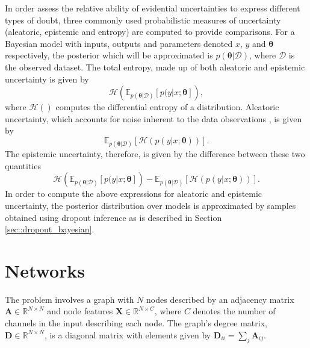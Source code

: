 \documentclass[
twocolumn,
]{ceurart}
\begin{document}
In order assess the relative ability of evidential uncertainties to express different types of doubt, three commonly used probabilistic measures of uncertainty (aleatoric, epistemic and entropy) are computed to provide comparisons.
For a Bayesian model with inputs, outputs and parameters denoted $x$, $y$ and $\boldsymbol{\theta}$ respectively, the posterior which will be approximated is $p(\boldsymbol{\theta}\vert\mathcal{D})$, where $\mathcal{D}$ is the observed dataset.
The total entropy, made up of both aleatoric and epistemic uncertainty \cite{Depeweg2018} is given by
\begin{equation}
    \mathcal{H}\left(\mathbb{E}_{p(\boldsymbol{\theta}\vert \mathcal{D})}\left[p(y\vert x;\boldsymbol{\theta}\right]\right),
\end{equation}
where $\mathcal{H}()$ computes the differential entropy of a distribution.
Aleatoric uncertainty, which accounts for noise inherent to the data observations \cite{Kendall2017}, is given by
\begin{equation}
    \mathbb{E}_{p\left(\boldsymbol{\theta}\vert \mathcal{D}\right)}\left[\mathcal{H}(p(y\vert x; \boldsymbol{\theta}))\right].
\end{equation}
The epistemic uncertainty, therefore, is given by the difference between these two quantities
\begin{equation}
    \mathcal{H}\left(\mathbb{E}_{p(\boldsymbol{\theta}\vert \mathcal{D})}\left[p(y\vert x;\boldsymbol{\theta}\right]\right)-\mathbb{E}_{p\left(\boldsymbol{\theta}\vert \mathcal{D}\right)}\left[\mathcal{H}(p(y\vert x; \boldsymbol{\theta}))\right].
\label{eq::epistemic}
\end{equation}
In order to compute the above expressions for aleatoric and epistemic uncertainty, the posterior distribution over models is approximated by samples obtained using dropout inference \cite{Gal2016} as is described in Section \ref{sec::dropout_bayesian}.

\section{Networks}
\label{sec::networks}
The problem involves a graph with $N$ nodes described by an adjacency matrix $\mathbf{A}\in\mathbb{R}^{N\times N}$ and node features $\mathbf{X}\in\mathbb{R}^{N\times C}$, where $C$ denotes the number of channels in the input describing each node.
The graph's degree matrix, $\mathbf{D}\in\mathbb{R}^{N\times N}$, is a diagonal matrix with elements given by $\mathbf{D}_{ii}=\sum_j\mathbf{A}_{ij} $.
\end{document}
